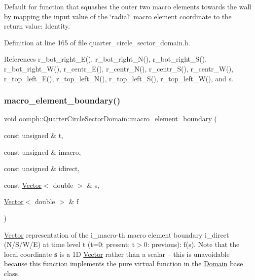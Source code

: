 Default for function that squashes the outer two macro elements towards the wall by mapping the input value of the \char`\"{}radial\char`\"{} macro element coordinate to the return value\+: Identity. 



Definition at line 165 of file quarter\+\_\+circle\+\_\+sector\+\_\+domain.\+h.



References r\+\_\+bot\+\_\+right\+\_\+\+E(), r\+\_\+bot\+\_\+right\+\_\+\+N(), r\+\_\+bot\+\_\+right\+\_\+\+S(), r\+\_\+bot\+\_\+right\+\_\+\+W(), r\+\_\+centr\+\_\+\+E(), r\+\_\+centr\+\_\+\+N(), r\+\_\+centr\+\_\+\+S(), r\+\_\+centr\+\_\+\+W(), r\+\_\+top\+\_\+left\+\_\+\+E(), r\+\_\+top\+\_\+left\+\_\+\+N(), r\+\_\+top\+\_\+left\+\_\+\+S(), r\+\_\+top\+\_\+left\+\_\+\+W(), and s.

\mbox{\label{classoomph_1_1QuarterCircleSectorDomain_a9faddf9d13e0a7633f732bac1ddda80b}} 
\subsubsection{\texorpdfstring{macro\+\_\+element\+\_\+boundary()}{macro\_element\_boundary()}}
{\footnotesize\ttfamily void oomph\+::\+Quarter\+Circle\+Sector\+Domain\+::macro\+\_\+element\+\_\+boundary (\begin{DoxyParamCaption}\item[{const unsigned \&}]{t,  }\item[{const unsigned \&}]{imacro,  }\item[{const unsigned \&}]{idirect,  }\item[{const \hyperlink{classoomph_1_1Vector}{Vector}$<$ double $>$ \&}]{s,  }\item[{\hyperlink{classoomph_1_1Vector}{Vector}$<$ double $>$ \&}]{f }\end{DoxyParamCaption})\hspace{0.3cm}{\ttfamily [virtual]}}



\hyperlink{classoomph_1_1Vector}{Vector} representation of the i\+\_\+macro-\/th macro element boundary i\+\_\+direct (N/\+S/\+W/E) at time level t (t=0\+: present; t$>$0\+: previous)\+: f(s). Note that the local coordinate {\bfseries s} is a 1D \hyperlink{classoomph_1_1Vector}{Vector} rather than a scalar -- this is unavoidable because this function implements the pure virtual function in the \hyperlink{classoomph_1_1Domain}{Domain} base class. 

